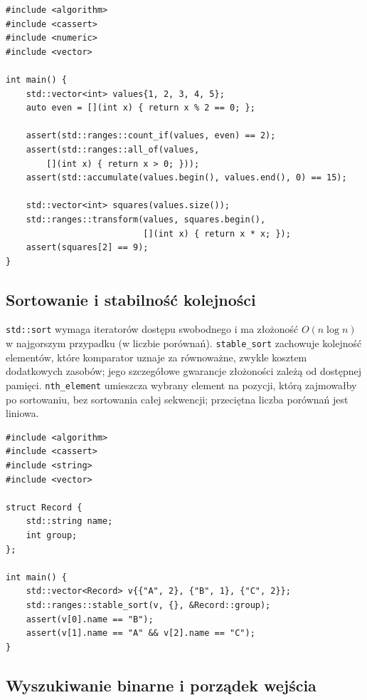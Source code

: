 \begin{lstlisting}[caption={Algorytmy klasyczne i Ranges (C++20); kompletny program.}]
#include <algorithm>
#include <cassert>
#include <numeric>
#include <vector>

int main() {
    std::vector<int> values{1, 2, 3, 4, 5};
    auto even = [](int x) { return x % 2 == 0; };

    assert(std::ranges::count_if(values, even) == 2);
    assert(std::ranges::all_of(values,
        [](int x) { return x > 0; }));
    assert(std::accumulate(values.begin(), values.end(), 0) == 15);

    std::vector<int> squares(values.size());
    std::ranges::transform(values, squares.begin(),
                           [](int x) { return x * x; });
    assert(squares[2] == 9);
}
\end{lstlisting}

\subsection{Sortowanie i stabilność kolejności}

\texttt{std::sort} wymaga iteratorów dostępu swobodnego i ma
złożoność $O(n\log n)$ w najgorszym przypadku (w liczbie porównań).
\texttt{stable\_sort} zachowuje kolejność elementów, które komparator
uznaje za równoważne, zwykle kosztem dodatkowych zasobów; jego
szczegółowe gwarancje złożoności zależą od dostępnej pamięci.
\texttt{nth\_element} umieszcza wybrany element na pozycji, którą
zajmowałby po sortowaniu, bez sortowania całej sekwencji; przeciętna
liczba porównań jest liniowa.

\begin{lstlisting}[caption={Stabilne sortowanie rekordow po kluczu (C++20); kompletny program.}]
#include <algorithm>
#include <cassert>
#include <string>
#include <vector>

struct Record {
    std::string name;
    int group;
};

int main() {
    std::vector<Record> v{{"A", 2}, {"B", 1}, {"C", 2}};
    std::ranges::stable_sort(v, {}, &Record::group);
    assert(v[0].name == "B");
    assert(v[1].name == "A" && v[2].name == "C");
}
\end{lstlisting}

\subsection{Wyszukiwanie binarne i porządek wejścia}

